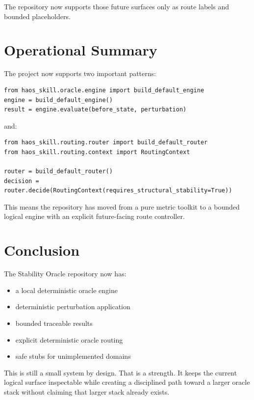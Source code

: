 \documentclass[11pt]{article}
\begin{document}
The repository now supports those future surfaces only as route labels and bounded placeholders.

\section{Operational Summary}

The project now supports two important patterns:

\begin{verbatim}
from haos_skill.oracle.engine import build_default_engine
engine = build_default_engine()
result = engine.evaluate(before_state, perturbation)
\end{verbatim}

and:

\begin{verbatim}
from haos_skill.routing.router import build_default_router
from haos_skill.routing.context import RoutingContext

router = build_default_router()
decision = router.decide(RoutingContext(requires_structural_stability=True))
\end{verbatim}

This means the repository has moved from a pure metric toolkit to a bounded logical engine with an explicit future-facing route controller.

\section{Conclusion}

The Stability Oracle repository now has:

\begin{itemize}
\item a local deterministic oracle engine
\item deterministic perturbation application
\item bounded traceable results
\item explicit deterministic oracle routing
\item safe stubs for unimplemented domains
\end{itemize}

This is still a small system by design.
That is a strength.
It keeps the current logical surface inspectable while creating a disciplined path toward a larger oracle stack without claiming that larger stack already exists.
\end{document}
